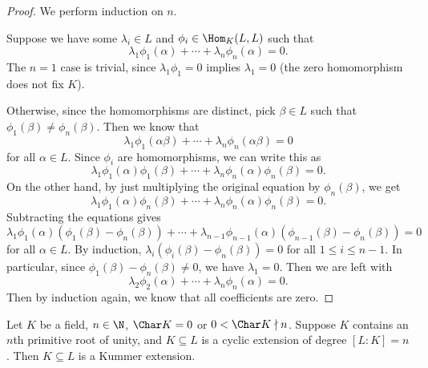\documentclass[a4paper]{article}
\begin{document}
\begin{proof}
  We perform induction on $n$.

  Suppose we have some $\lambda_i \in L$ and $\phi_i \in \Hom_K(L, L)$ such that
  \[
    \lambda_1 \phi_1(\alpha) + \cdots + \lambda_n \phi_n(\alpha) = 0.
  \]
  The $n = 1$ case is trivial, since $\lambda_1 \phi_1 = 0$ implies $\lambda_1 = 0$ (the zero homomorphism does not fix $K$).

  Otherwise, since the homomorphisms are distinct, pick $\beta \in L$ such that $\phi_1(\beta) \not= \phi_n(\beta)$. Then we know that
  \[
    \lambda_1 \phi_1(\alpha\beta) + \cdots + \lambda_n \phi_n(\alpha\beta) = 0
  \]
  for all $\alpha \in L$. Since $\phi_i$ are homomorphisms, we can write this as
  \[
    \lambda_1 \phi_1(\alpha)\phi_1(\beta) + \cdots + \lambda_n \phi_n(\alpha)\phi_n(\beta) = 0.
  \]
  On the other hand, by just multiplying the original equation by $\phi_n(\beta)$, we get
  \[
    \lambda_1 \phi_1(\alpha)\phi_n(\beta) + \cdots + \lambda_n \phi_n(\alpha)\phi_n(\beta) = 0.
  \]
  Subtracting the equations gives
  \[
    \lambda_1 \phi_1(\alpha) (\phi_1(\beta) - \phi_n(\beta)) + \cdots + \lambda_{n - 1}\phi_{n - 1}(\alpha) (\phi_{n - 1}(\beta) - \phi_n(\beta)) = 0
  \]
  for all $\alpha \in L$. By induction, $\lambda_i(\phi_i(\beta) - \phi_n(\beta)) = 0$ for all $1 \leq i \leq n - 1$. In particular, since $\phi_1(\beta) - \phi_n(\beta) \not= 0$, we have $\lambda_1 = 0$. Then we are left with
  \[
    \lambda_2 \phi_2(\alpha) + \cdots + \lambda_n \phi_n(\alpha) = 0.
  \]
  Then by induction again, we know that all coefficients are zero.
\end{proof}

\begin{thm}
  Let $K$ be a field, $n \in \N$, $\Char K = 0$ or $0 < \Char K \nmid n$. Suppose $K$ contains an $n$th primitive root of unity, and $K\subseteq L$ is a cyclic extension of degree $[L:K] = n$. Then $K\subseteq L$ is a Kummer extension.
\end{thm}
\end{document}
